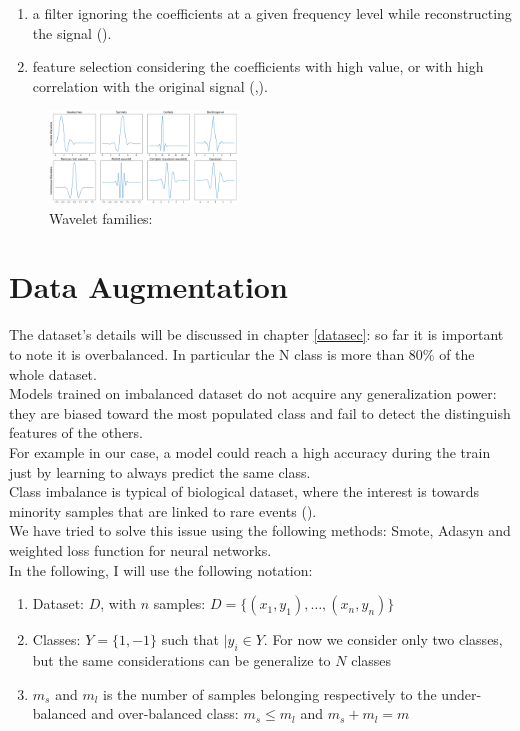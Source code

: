 \documentclass[LaM,binding=0.6cm]{sapthesis}
\begin{document}
\begin{enumerate}
\item a filter ignoring the coefficients at a given frequency level while reconstructing the signal (\cite{lnlf}).
\item feature selection considering the coefficients with high value, or with high correlation with the original signal (\cite{rfdwt},\cite{lnlf}).
\end{enumerate}
\begin{figure}[H]
	\includegraphics[width=50mm,scale=0.7]{waveletfamilies.png}
	\caption{Wavelet families: \cite{watut} }
	\label{fig:wf}
\end{figure}




\section{Data Augmentation}
The dataset's details will be discussed in chapter \ref{datasec}: so far it is important to note it is overbalanced. In particular the N class is more than 80\% of the whole dataset.\\Models trained on imbalanced dataset do not acquire any generalization power: they are biased toward the most populated class and fail to detect the distinguish features of the others.\\For example in our case, a model could reach a high accuracy during the train just by learning to always predict the same class.\\Class imbalance is typical of biological dataset, where the interest is towards minority samples that are linked to rare events (\cite{onf/ijcnn/HeBGL08}).\\We have tried to solve this issue using the following methods: Smote, Adasyn and weighted loss function for neural networks.\\In the following, I will use the following notation:
\begin{enumerate}
\item Dataset: $D$, with $n$ samples: $D=\{(x_1,y_1),\dots,(x_n,y_n)\}$
\item Classes: $Y=\{1,-1\}$ such that $|y_i \in Y$. For now we consider only two classes, but the same considerations can be generalize to $N$ classes 
\item $m_s$ and $m_l$ is the number of samples belonging respectively to the under-balanced and over-balanced class: $m_s\leq m_l$ and $m_s+m_l=m$
\end{enumerate}
\end{document}
